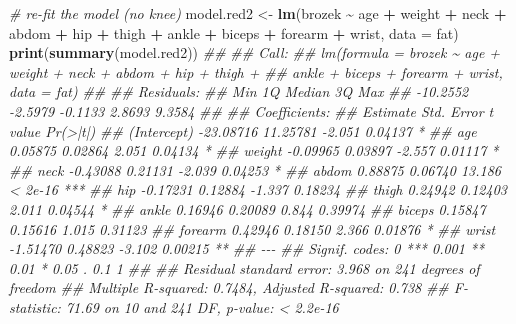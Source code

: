 \documentclass[
]{book}
\newenvironment{Shaded}{\begin{snugshade}}{\end{snugshade}}
\newcommand{\CommentTok}[1]{\textcolor[rgb]{0.56,0.35,0.01}{\textit{#1}}}
\newcommand{\DataTypeTok}[1]{\textcolor[rgb]{0.13,0.29,0.53}{#1}}
\newcommand{\KeywordTok}[1]{\textcolor[rgb]{0.13,0.29,0.53}{\textbf{#1}}}
\newcommand{\NormalTok}[1]{#1}
\newcommand{\OperatorTok}[1]{\textcolor[rgb]{0.81,0.36,0.00}{\textbf{#1}}}
\newcommand{\StringTok}[1]{\textcolor[rgb]{0.31,0.60,0.02}{#1}}
\theoremstyle{definition}
\theoremstyle{definition}
\theoremstyle{definition}
\theoremstyle{remark}
\begin{document}
\begin{Shaded}
\begin{Highlighting}[]
\CommentTok{\# re{-}fit the model (no knee)}
\NormalTok{model.red2 \textless{}{-}}\StringTok{ }\KeywordTok{lm}\NormalTok{(brozek }\OperatorTok{\textasciitilde{}}\StringTok{ }\NormalTok{age }\OperatorTok{+}\StringTok{ }\NormalTok{weight }\OperatorTok{+}\StringTok{ }\NormalTok{neck }\OperatorTok{+}\StringTok{ }\NormalTok{abdom }\OperatorTok{+}\StringTok{ }\NormalTok{hip }\OperatorTok{+}\StringTok{ }\NormalTok{thigh }\OperatorTok{+}\StringTok{ }\NormalTok{ankle }\OperatorTok{+}\StringTok{ }\NormalTok{biceps }\OperatorTok{+}\StringTok{ }\NormalTok{forearm }\OperatorTok{+}\StringTok{ }\NormalTok{wrist, }\DataTypeTok{data =}\NormalTok{ fat)}
\KeywordTok{print}\NormalTok{(}\KeywordTok{summary}\NormalTok{(model.red2))}
\CommentTok{\#\# }
\CommentTok{\#\# Call:}
\CommentTok{\#\# lm(formula = brozek \textasciitilde{} age + weight + neck + abdom + hip + thigh + }
\CommentTok{\#\#     ankle + biceps + forearm + wrist, data = fat)}
\CommentTok{\#\# }
\CommentTok{\#\# Residuals:}
\CommentTok{\#\#      Min       1Q   Median       3Q      Max }
\CommentTok{\#\# {-}10.2552  {-}2.5979  {-}0.1133   2.8693   9.3584 }
\CommentTok{\#\# }
\CommentTok{\#\# Coefficients:}
\CommentTok{\#\#              Estimate Std. Error t value Pr(\textgreater{}|t|)    }
\CommentTok{\#\# (Intercept) {-}23.08716   11.25781  {-}2.051  0.04137 *  }
\CommentTok{\#\# age           0.05875    0.02864   2.051  0.04134 *  }
\CommentTok{\#\# weight       {-}0.09965    0.03897  {-}2.557  0.01117 *  }
\CommentTok{\#\# neck         {-}0.43088    0.21131  {-}2.039  0.04253 *  }
\CommentTok{\#\# abdom         0.88875    0.06740  13.186  \textless{} 2e{-}16 ***}
\CommentTok{\#\# hip          {-}0.17231    0.12884  {-}1.337  0.18234    }
\CommentTok{\#\# thigh         0.24942    0.12403   2.011  0.04544 *  }
\CommentTok{\#\# ankle         0.16946    0.20089   0.844  0.39974    }
\CommentTok{\#\# biceps        0.15847    0.15616   1.015  0.31123    }
\CommentTok{\#\# forearm       0.42946    0.18150   2.366  0.01876 *  }
\CommentTok{\#\# wrist        {-}1.51470    0.48823  {-}3.102  0.00215 ** }
\CommentTok{\#\# {-}{-}{-}}
\CommentTok{\#\# Signif. codes:  0 \textquotesingle{}***\textquotesingle{} 0.001 \textquotesingle{}**\textquotesingle{} 0.01 \textquotesingle{}*\textquotesingle{} 0.05 \textquotesingle{}.\textquotesingle{} 0.1 \textquotesingle{} \textquotesingle{} 1}
\CommentTok{\#\# }
\CommentTok{\#\# Residual standard error: 3.968 on 241 degrees of freedom}
\CommentTok{\#\# Multiple R{-}squared:  0.7484,	Adjusted R{-}squared:  0.738 }
\CommentTok{\#\# F{-}statistic: 71.69 on 10 and 241 DF,  p{-}value: \textless{} 2.2e{-}16}


\end{Highlighting}
\end{Shaded}
\end{document}
